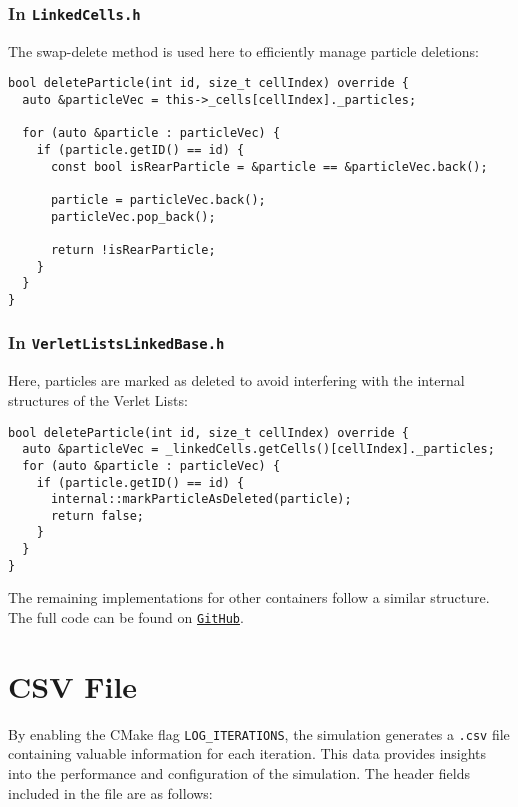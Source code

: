\subsubsection{In 	\texttt{LinkedCells.h}}
The swap-delete method is used here to efficiently manage particle deletions:
\begin{lstlisting}[style=cppstyle]
bool deleteParticle(int id, size_t cellIndex) override {
  auto &particleVec = this->_cells[cellIndex]._particles;

  for (auto &particle : particleVec) {
    if (particle.getID() == id) {
      const bool isRearParticle = &particle == &particleVec.back();

      particle = particleVec.back();
      particleVec.pop_back();

      return !isRearParticle;
    }
  }
}
\end{lstlisting}

\subsubsection{In 	\texttt{VerletListsLinkedBase.h}}
Here, particles are marked as deleted to avoid interfering with the internal structures of the Verlet Lists:
\begin{lstlisting}[style=cppstyle]
bool deleteParticle(int id, size_t cellIndex) override {
  auto &particleVec = _linkedCells.getCells()[cellIndex]._particles;
  for (auto &particle : particleVec) {
    if (particle.getID() == id) {
      internal::markParticleAsDeleted(particle);
      return false;
    }
  }
}
\end{lstlisting}

The remaining implementations for other containers follow a similar structure. The full code can be found on \href{https://github.com/AutoPas/AutoPas/commit/d251b0ab8544a76f4e8150bf5e91c09d874d4f4c}{\texttt{GitHub}}. 


\section{CSV File}

By enabling the CMake flag \texttt{LOG\_ITERATIONS}, the simulation generates a \texttt{.csv} file containing valuable information for each iteration. This data provides insights into the performance and configuration of the simulation. The header fields included in the file are as follows:

